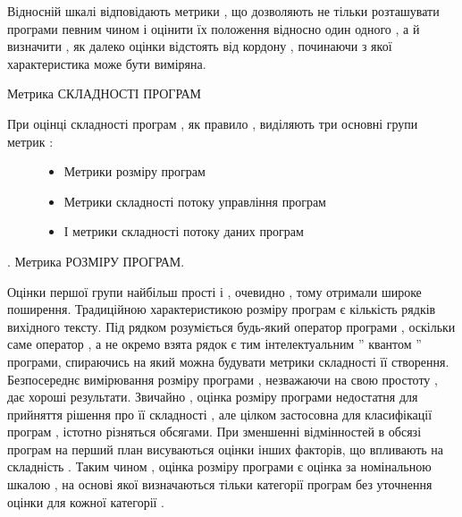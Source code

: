 Відносній шкалі відповідають метрики , що дозволяють не тільки розташувати програми певним чином і оцінити їх положення відносно один одного , а й визначити , як далеко оцінки відстоять від кордону , починаючи з якої характеристика може бути виміряна.

Метрика СКЛАДНОСТІ ПРОГРАМ
\begin{description}
\item[{При оцінці складності програм , як правило , виділяють три основні групи метрик :}] \leavevmode\begin{itemize}
\item {} 
Метрики розміру програм

\item {} 
Метрики складності потоку управління програм

\item {} 
І метрики складності потоку даних програм

\end{itemize}

\end{description}

.
Метрика РОЗМІРУ ПРОГРАМ.

Оцінки першої групи найбільш прості і , очевидно , тому отримали широке поширення. Традиційною характеристикою розміру програм є кількість рядків вихідного тексту. Під рядком розуміється будь-який оператор програми , оскільки саме оператор , а не окремо взята рядок є тим інтелектуальним '' квантом '' програми, спираючись на який можна будувати метрики складності її створення.
Безпосереднє вимірювання розміру програми , незважаючи на свою простоту , дає хороші результати. Звичайно , оцінка розміру програми недостатня для прийняття рішення про її складності , але цілком застосовна для класифікації програм , істотно різняться обсягами. При зменшенні відмінностей в обсязі програм на перший план висуваються оцінки інших факторів, що впливають на складність . Таким чином , оцінка розміру програми є оцінка за номінальною шкалою , на основі якої визначаються тільки категорії програм без уточнення оцінки для кожної категорії .

